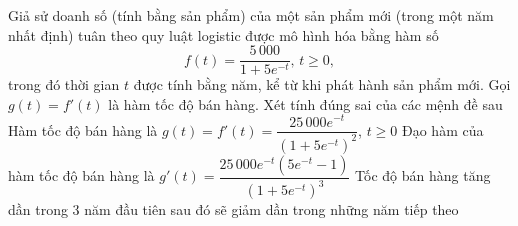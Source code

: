 \begin{ex}%
	Giả sử doanh số (tính bằng sản phẩm) của một sản phẩm mới (trong một năm nhất định) tuân theo quy luật logistic được mô hình hóa bằng hàm số \[f(t)=\dfrac{5\,000}{1+5e^{-t}},\, t\ge0,\]
	trong đó thời gian $t$ được tính bằng năm, kể từ khi phát hành sản phẩm mới. Gọi $g(t)=f'(t)$ là hàm tốc độ bán hàng. Xét tính đúng sai của các mệnh đề sau
	{\True Hàm tốc độ bán hàng là $g(t)=f'(t)=\dfrac{25\,000e^{-t}}{(1+5e^{-t})^2}$, $t\ge0$}
	{\True Đạo hàm của hàm tốc độ bán hàng là $g'(t)=\dfrac{25\,000e^{-t}(5e^{-t}-1)}{(1+5e^{-t})^3}$}
	{Tốc độ bán hàng tăng dần trong 3 năm đầu tiên sau đó sẽ giảm dần trong những năm tiếp theo}
\end{ex}

